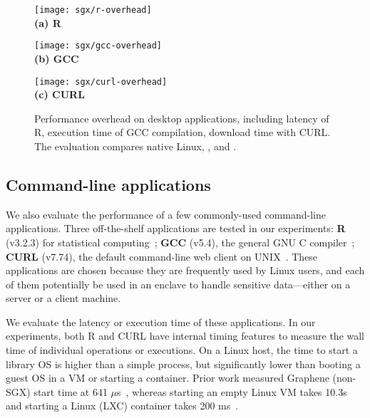 \begin{figure*}[t!]
\centering

\begin{minipage}{.4\textwidth}
\centering
\texttt{[image: sgx/r-overhead]}\\
{\bf (a) R}
\end{minipage}
\begin{minipage}{.275\textwidth}
\centering
\texttt{[image: sgx/gcc-overhead]}\\
{\bf (b) GCC}
\end{minipage}
\begin{minipage}{.25\textwidth}
\centering
\texttt{[image: sgx/curl-overhead]}\\
{\bf (c) CURL}
\end{minipage}

\caption{Performance overhead on desktop applications, including latency of R, execution time of GCC compilation, download time with CURL. The evaluation compares native Linux, \graphene{}, and \graphenesgx{}.} %
\label{fig:desktop-overhead}
\end{figure*}



\subsection{Command-line applications}


We also evaluate the performance of a few commonly-used command-line applications.
Three off-the-shelf applications are tested in our experiments:
{\bf R} (v3.2.3) for statistical computing~\cite{r-project}; {\bf GCC} (v5.4), the general GNU C compiler~\cite{gcc}; {\bf CURL} (v7.74), the default command-line web client on UNIX~\cite{curl}.
These applications are chosen because they are frequently used by Linux users,
and each of them potentially  be used 
in an enclave to handle sensitive data---either on a server or a client
machine.



We evaluate the latency or execution time of these applications. 
In our experiments, both R and CURL have internal timing features to measure the wall time
of individual operations or executions.
On a Linux host, the time to start a library OS is higher than a simple 
process, but significantly lower than booting a guest OS in a VM or
starting a container. 
Prior work measured Graphene (non-SGX) start time at 641 $\mu$s~\cite{tsai14graphene}, whereas starting an empty Linux VM takes 10.3s and starting a Linux (LXC) container takes 200 ms~\cite{agarwal15container}. 


